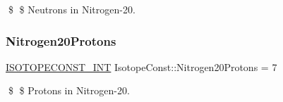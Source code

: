 \$ \$ Neutrons in Nitrogen-\/20. \mbox{\label{group___isotope_const-_nitrogen-_n20_ga87fa10f9fb74ac6a665400cefba57152}} 
\subsubsection{\texorpdfstring{Nitrogen20\+Protons}{Nitrogen20Protons}}
{\footnotesize\ttfamily \mbox{\hyperlink{group___isotope_const-_macros_ga5f18360b3e99483a35c32d789e62621c}{I\+S\+O\+T\+O\+P\+E\+C\+O\+N\+S\+T\+\_\+\+I\+NT}} Isotope\+Const\+::\+Nitrogen20\+Protons = 7}

\$ \$ Protons in Nitrogen-\/20. 